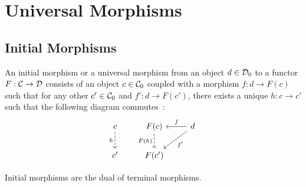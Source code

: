 \section{Universal Morphisms}

\subsection{Initial Morphisms}

\begin{definition}
	An initial morphism or a universal morphism from an object $d\in \mathcal{D}_0$ to a
	functor $F:\mathcal{C}\to \mathcal{D}$ consists of an object $c\in \mathcal{C}_0$ coupled with a morphism
	$f: d\to F(c)$ such that for any other $c'\in \mathcal{C}_0$ and $f': d \to F(c')$,
	there exists a unique $h:c\to c'$ such that the following diagram
	commutes~\parencite[p.~55]{lane:working_mathematician}:
	\[\begin{tikzcd}[ampersand replacement=\&]
		c \& {F(c)} \& d \\
		{c'} \& {F(c')}
		\arrow["h"', dashed, from=1-1, to=2-1]
		\arrow["{F(h)}"', dashed, from=1-2, to=2-2]
		\arrow["{f'}", from=1-3, to=2-2]
		\arrow["f"', from=1-3, to=1-2]
	\end{tikzcd}\]
\end{definition}

\begin{remark}
	Initial morphisms are the dual of terminal morphisms.
\end{remark}

